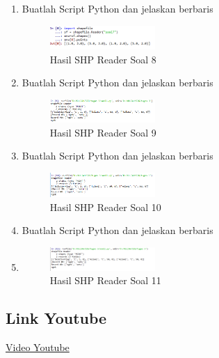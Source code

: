 \begin{enumerate}
    \item Buatlah Script Python dan jelaskan berbaris
    
    \hfill\break
    \begin{figure}[H]
		\includegraphics[width=4cm]{figures/1174012/3/8.png}
		\centering
		\caption{Hasil SHP Reader Soal 8}
    \end{figure}

    \item Buatlah Script Python dan jelaskan berbaris
    
    \hfill\break
    \begin{figure}[H]
		\includegraphics[width=4cm]{figures/1174012/3/9.png}
		\centering
		\caption{Hasil SHP Reader Soal 9}
    \end{figure}

    \item Buatlah Script Python dan jelaskan berbaris
    
    \hfill\break
    \begin{figure}[H]
		\includegraphics[width=4cm]{figures/1174012/3/10.png}
		\centering
		\caption{Hasil SHP Reader Soal 10}
    \end{figure}

    \item Buatlah Script Python dan jelaskan berbaris
    \item 
    \hfill\break
    \begin{figure}[H]
		\includegraphics[width=4cm]{figures/1174012/3/11.png}
		\centering
		\caption{Hasil SHP Reader Soal 11}
    \end{figure}
\end{enumerate}
\subsection{Link Youtube}
\href{ttps://youtu.be/RQRUBlBzY30}{Video Youtube}